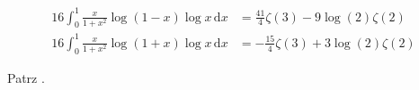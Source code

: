 %

\begin{problem_with_solution}
    \label{valean_1_14}%
    \begin{align}
        16 \int_0^1 \frac{x}{1+ x^2} \log (1 - x) \log x \,\mathrm{d}x & = \frac{41}{4} \zeta(3) - 9 \log(2) \zeta(2) \\
        16 \int_0^1 \frac{x}{1+ x^2} \log (1 + x) \log x \,\mathrm{d}x & = -\frac{15}{4} \zeta(3) + 3 \log(2) \zeta(2)
    \end{align} 
\end{problem_with_solution}


\begin{solution}
    Patrz \cite[s. 8]{valean19}.
\end{solution}

%